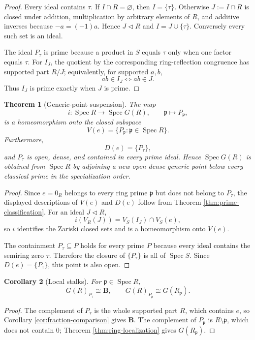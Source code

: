 \documentclass[11pt]{amsart}
\numberwithin{equation}{section}
\newtheorem{theorem}{Theorem}[section]
\newtheorem{corollary}[theorem]{Corollary}
\theoremstyle{definition}
\newcommand{\B}{\mathbf B}
\newcommand{\Spec}{\operatorname{Spec}}
\begin{document}
\begin{proof}
Every ideal contains $\tau$.  If $I\cap R=\varnothing$, then $I=\{\tau\}$.  Otherwise $J:=I\cap R$ is closed under addition, multiplication by arbitrary elements of $R$, and additive inverses because $-a=(-1)a$.  Hence $J\triangleleft R$ and $I=J\cup\{\tau\}$.  Conversely every such set is an ideal.

The ideal $P_\tau$ is prime because a product in $S$ equals $\tau$ only when one factor equals $\tau$.  For $I_J$, the quotient by the corresponding ring-reflection congruence has supported part $R/J$; equivalently, for supported $a,b$,
\[
ab\in I_J
\iff
ab\in J.
\]
Thus $I_J$ is prime exactly when $J$ is prime.
\end{proof}

\begin{theorem}[Generic-point suspension]\label{thm:generic-suspension}
The map
\[
i:\Spec R\longrightarrow\Spec G(R),
\qquad
\mathfrak p\longmapsto P_{\mathfrak p},
\]
is a homeomorphism onto the closed subspace
\[
V(e)=\{P_{\mathfrak p}:\mathfrak p\in\Spec R\}.
\]
Furthermore,
\[
D(e)=\{P_\tau\},
\]
and $P_\tau$ is open, dense, and contained in every prime ideal.  Hence $\Spec G(R)$ is obtained from $\Spec R$ by adjoining a new open dense generic point below every classical prime in the specialization order.
\end{theorem}

\begin{proof}
Since $e=0_R$ belongs to every ring prime $\mathfrak p$ but does not belong to $P_\tau$, the displayed descriptions of $V(e)$ and $D(e)$ follow from Theorem \ref{thm:prime-classification}.  For an ideal $J\triangleleft R$,
\[
i(V_R(J))
=
V_S(I_J)\cap V_S(e),
\]
so $i$ identifies the Zariski closed sets and is a homeomorphism onto $V(e)$.

The containment $P_\tau\subseteq P$ holds for every prime $P$ because every ideal contains the semiring zero $\tau$.  Therefore the closure of $\{P_\tau\}$ is all of $\Spec S$.  Since $D(e)=\{P_\tau\}$, this point is also open.
\end{proof}

\begin{corollary}[Local stalks]\label{cor:split-stalks}
For $\mathfrak p\in\Spec R$,
\[
G(R)_{P_\tau}\cong\B,
\qquad
G(R)_{P_{\mathfrak p}}\cong G(R_{\mathfrak p}).
\]
\end{corollary}

\begin{proof}
The complement of $P_\tau$ is the whole supported part $R$, which contains $e$, so Corollary \ref{cor:fraction-comparison} gives $\B$.  The complement of $P_{\mathfrak p}$ is $R\setminus\mathfrak p$, which does not contain $0$; Theorem \ref{thm:ring-localization} gives $G(R_{\mathfrak p})$.
\end{proof}
\end{document}
